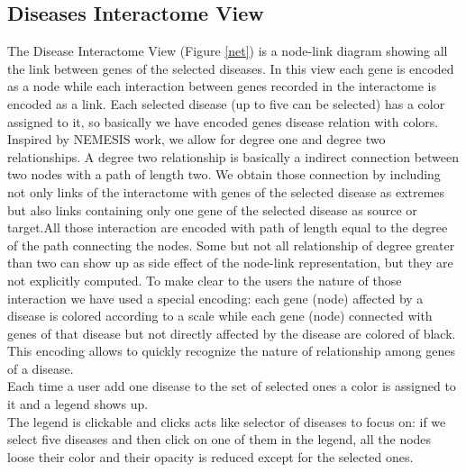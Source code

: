 \documentclass[12pt,twocolumn,twoside]{article}
\begin{document}
\subsection*{Diseases Interactome View}
The Disease Interactome View (Figure \ref{net}) is a node-link diagram showing all the link between genes of the selected diseases. In this view each gene is encoded as a node while each interaction between genes recorded in the interactome is encoded as a link. Each selected disease (up to five can be selected) has a color assigned to it, so basically we have encoded genes disease relation with colors.\\
Inspired by NEMESIS\cite{ivapp19} work, we allow for degree one and degree two relationships. A degree two relationship is basically a indirect connection between two nodes with a path of length two. We obtain those connection by including not only links of the interactome with genes of the selected disease as extremes but also links containing only one gene of the selected disease as source or target.\newline All those interaction are encoded with path of length equal to the degree of the path connecting the nodes. Some but not all relationship of degree greater than two can show up as side effect of the node-link representation, but they are not explicitly computed. To make clear to the users the nature of those interaction we have used a special encoding: each gene (node) affected by a disease is colored according to a scale while each gene (node) connected with genes of that disease but not directly affected by the disease are colored of black.  This encoding allows to quickly recognize the nature of relationship among genes of a disease.\\ 
Each time a user add one disease to the set of selected ones a color is assigned to it and a legend shows up.\\ The legend is clickable and clicks acts like selector of diseases to focus on: if we select five diseases and then click on one of them in the legend, all the nodes loose their color and their opacity is reduced except for the selected ones. \\
\end{document}
